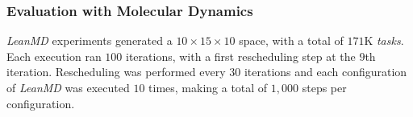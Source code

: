 \subsubsection{Evaluation with Molecular Dynamics} \label{sec:sdumont:md}

\textit{LeanMD} experiments generated a $10\times15\times10$ space, with a total of $171$K \textit{tasks}.
Each execution ran $100$ iterations, with a first rescheduling step at the $9$th iteration. 
Rescheduling was performed every $30$ iterations and each configuration of \textit{LeanMD} was executed $10$ times, making a total of $1,000$ steps per configuration. 

%	


